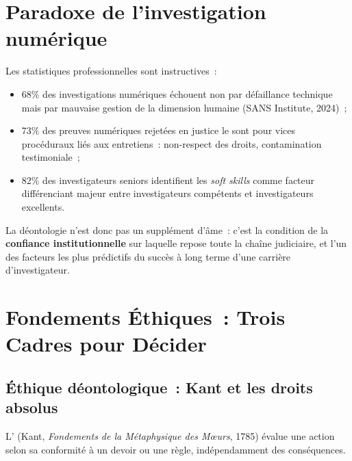 \bigskip

\section*{Paradoxe de l'investigation numérique}

Les statistiques professionnelles sont instructives~:
\begin{itemize}
    \item 68\% des investigations numériques échouent non par défaillance
          technique mais par mauvaise gestion de la dimension humaine
          (SANS Institute, 2024)~;
    \item 73\% des preuves numériques rejetées en justice le sont pour
          vices procéduraux liés aux entretiens~: non-respect des droits,
          contamination testimoniale~;
    \item 82\% des investigateurs seniors identifient les \textit{soft skills}
          comme facteur différenciant majeur entre investigateurs compétents
          et investigateurs excellents.
\end{itemize}

La déontologie n'est donc pas un supplément d'âme~: c'est la condition
de la \textbf{confiance institutionnelle} sur laquelle repose toute
la chaîne judiciaire, et l'un des facteurs les plus prédictifs du
succès à long terme d'une carrière d'investigateur.

\separateur

\section{Fondements Éthiques~: Trois Cadres pour Décider}
\label{sec:fondements-ethiques}

\subsection{Éthique déontologique~: Kant et les droits absolus}

L' (Kant,
\textit{Fondements de la Métaphysique des M\oe urs}, 1785) évalue une
action selon sa conformité à un devoir ou une règle, indépendamment
des conséquences.

